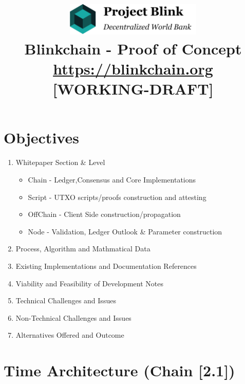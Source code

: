 \documentclass[a4paper,11pt]{article}
\title{

\centering
\includegraphics[width=6.5cm]{logo}\\
\vspace{5mm}
Blinkchain - Proof of Concept\\
\vspace{2mm}
\footnotesize{\url{https://blinkchain.org}}\\
\vspace{3mm}
\small{[WORKING-DRAFT]}}
\date{\vspace{-5ex}}
\begin{document}
\maketitle

\newpage
\tableofcontents

\newpage
\section{Objectives}

\begin{enumerate}
\item Whitepaper Section \& Level
\begin{itemize}
\item Chain - Ledger,Consensus and Core Implementations
\item Script - UTXO scripts/proofs construction and attesting
\item OffChain - Client Side construction/propagation
\item Node - Validation, Ledger Outlook \& Parameter construction
\end{itemize}
\item Process, Algorithm and Mathmatical Data
\item Existing Implementations and Documentation References
\item Viability and Feasibility of Development Notes
\item Technical Challenges and Issues
\item Non-Technical Challenges and Issues
\item Alternatives Offered and Outcome
\end{enumerate}

\section{Time Architecture (Chain [2.1])}
\end{document}
